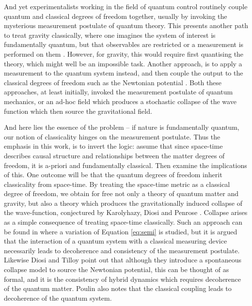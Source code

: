 \documentclass[aps,pra,showpacs,citeautoscript,amsmath,amssymb,floatfix,superscriptaddress,bbm, verbatim,amsfonts,changes,11pt,nofootinbib,longbibliography]{revtex4-2}
\begin{document}
And yet experimentalists working in the field of quantum control routinely couple quantum and classical degrees of freedom together, usually by invoking the mysterious measurement postulate of quantum theory. This presents another path to treat gravity classically, where one 
imagines the system of interest is fundamentally quantum, but that observables are restricted or a measurement is performed on them
 \cite{jauch1964problem,diosi1998coupling,diosi2000quantum,peres2001hybrid}. However, for gravity, this would require first quantising the theory, which might well be an impossible task. Another approach, is to apply a measurement to the quantum system instead, and then couple the output to the classical degrees of freedom such as the Newtonian potential \cite{kafri2014classical,tilloy2016sourcing,tilloy2017principle,dowker2008dynamical}.  Both these approaches, at least initially, invoked the measurement postulate of quantum mechanics, or an ad-hoc field which produces a stochastic collapse of the wave function
 \cite{pearle-csl1,grw85,grw86,gisin-percival,adler2001generalized,sep-qm-collapse} which then source the gravitational field. 

And here lies the essence of the problem -- if nature is fundamentally quantum, our notion of classicality hinges on the measurement postulate. Thus the emphasis in this work, is to invert the logic: assume that since space-time describes causal structure and relationships between the matter degrees of freedom, it is a-priori and fundamentally classical. Then examine the implications of this. One outcome will be that the quantum degrees of freedom inherit classicality from space-time. By treating the space-time metric as a classical degree of freedom, we obtain for free not only a 
theory of quantum matter and gravity, but also a theory which produces the
 gravitationally induced collapse of the wave-function, conjectured by Karolyhazy, Diosi and Penrose \cite{karolyhazy1966gravitation,diosi1989models,penrose1996gravity} \cite{penrose_foot}. Collapse arises as a simple consequence of treating space-time classically. Such an approach can be found in  \cite{hall2005interacting} where a variation of Equation \eqref{eq:semi} is studied, but it is argued that the interaction of a quantum system with a classical measuring device necessarily leads to decoherence and consistency of the measurement postulate. Likewise Diosi and Tilloy \cite{tilloy2016sourcing,tilloy2017principle} point out that although they introduce a spontaneous collapse model to source the Newtonian potential, this can be thought of as formal, and it is the consistency of hybrid dynamics which requires decoherence of the quantum matter.  Poulin  \cite{poulinKITP} also notes that the classical coupling leads to decoherence of the quantum system.
 
\end{document}
